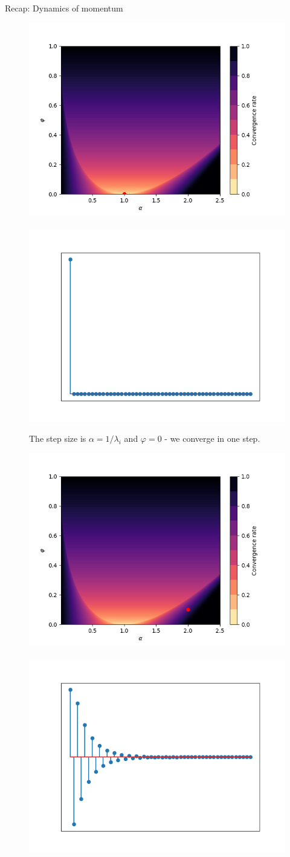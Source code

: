 \documentclass[11pt,compress,t,notes=noshow, xcolor=table]{beamer}
\begin{document}
\begin{vbframe}{Recap: Dynamics of momentum}
\framebreak
\vspace*{1.0cm}
\begin{figure}
	\includegraphics[height=0.35\textwidth, keepaspectratio]{figure_man/momentum_conv_1step.png} ~~ \includegraphics[height=0.35\textwidth, keepaspectratio]{figure_man/momentum_1step.png} \\
	\begin{footnotesize} 
		The step size is $\alpha = 1/\lambda_i$ and $\varphi = 0$ - we converge in one step.
	\end{footnotesize}
\end{figure}
\framebreak
\vspace*{1.0cm}
\begin{figure}
	\includegraphics[height=0.35\textwidth, keepaspectratio]{figure_man/momentum_conv_osc.png} ~~ \includegraphics[height=0.35\textwidth, keepaspectratio]{figure_man/momentum_osc.png} \\

\end{figure}
\end{vbframe}
\end{document}
